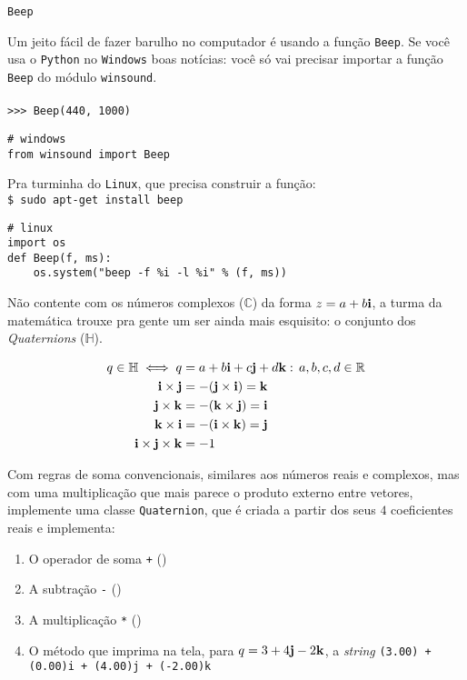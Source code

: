 \documentclass[12pt]{article}
\begin{document}
	\begin{interlude}{\texttt{Beep}}
	
	Um jeito fácil de fazer barulho no computador é usando a função \texttt{Beep}. Se você usa o \texttt{Python} no \texttt{Windows} boas notícias: você só vai precisar importar a função \texttt{Beep} do módulo \texttt{winsound}.\\
	\\
	\texttt{>>> Beep(440, 1000)}
	\begin{lstlisting}
# windows
from winsound import Beep
	\end{lstlisting}
	Pra turminha do \texttt{Linux}, que precisa construir a função: \\
	\texttt{\$ sudo apt-get install beep}
	\begin{lstlisting}
# linux
import os
def Beep(f, ms):
    os.system("beep -f %i -l %i" % (f, ms))
	\end{lstlisting}
	
	\end{interlude}

	
	Não contente com os números complexos ($\mathbb{C}$) da forma $z = a + b\mathbf{i}$, a turma da matemática trouxe pra gente um ser ainda mais esquisito: o conjunto dos \emph{Quaternions} ($\mathbb{H}$).
	
	\begin{align*}
	q \in \mathbb{H} \iff q &= a + b \mathbf{i} + c \mathbf{j} + d \mathbf{k} : \, a,b,c,d \in \mathbb{R}\\
	\mathbf{i} \times \mathbf{j} &= -(\mathbf{j} \times \mathbf{i}) = \mathbf{k}\\
	\mathbf{j} \times \mathbf{k} &= -(\mathbf{k} \times \mathbf{j}) = \mathbf{i}\\
	\mathbf{k} \times \mathbf{i} &= -(\mathbf{i} \times \mathbf{k}) = \mathbf{j}\\
	\mathbf{i} \times \mathbf{j} \times \mathbf{k} &= -1	
	\end{align*}
	
	\quest Com regras de soma convencionais, similares aos números reais e complexos, mas com uma multiplicação que mais parece o produto externo entre vetores, implemente uma classe \texttt{Quaternion}, que é criada a partir dos seus $4$ coeficientes reais e implementa:
	\begin{enumerate}
		\item O operador de soma \texttt{+} ()
		\item A subtração \texttt{-} ()
		\item A multiplicação \texttt{*} ()
		\item O método  que imprima na tela, para $q = 3 + 4\mathbf{j} - 2\mathbf{k}$, a \textit{string} \texttt{(3.00) + (0.00)i + (4.00)j + (-2.00)k}
	\end{enumerate}
	
\end{document}
